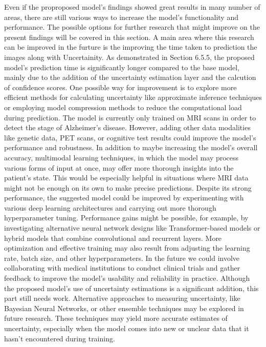 \documentclass[12pt,onecolumn]{report}
\begin{document}
Even if the proproposed model's findings showed great results in many number of areas, there are still various ways to increase the model's functionality and performance. The possible options for further research that might improve on the present findings will be covered in this section.
A main area where this research can be improved in the furture is the improving the time taken to prediction the images along with Uncertainity. As demonstrated in Section 6.5.5, the proposed model's prediction time is significantly longer compared to the base model, mainly due to the addition of the uncertainty estimation layer and the calcution of confidence scores. One possible way for improvement is to explore more efficient methods for calculating uncertainty like approximate inference techniques or employing model compression methods to reduce the computational load during prediction.
The model is currently only trained on MRI scans in order to detect the stage of Alzheimer's disease. However, adding other data modalities like genetic data, PET scans, or cognitive test results could improve the model's performance and robustness. In addition to maybe increasing the model's overall accuracy, multimodal learning techniques, in which the model may process various forms of input at once, may offer more thorough insights into the patient's state. This would be especially helpful in situations where MRI data might not be enough on its own to make precise predictions.
Despite its strong performance, the suggested model could be improved by experimenting with various deep learning architectures and carrying out more thorough hyperparameter tuning. Performance gains might be possible, for example, by investigating alternative neural network designs like Transformer-based models or hybrid models that combine convolutional and recurrent layers. More optimization and effective training may also result from adjusting the learning rate, batch size, and other hyperparameters.
In the future we could involve collaborating with medical institutions to conduct clinical trials and gather feedback to improve the model’s usability and reliability in practice.
Although the proposed model's use of uncertainty estimations is a significant addition, this part still needs work. Alternative approaches to measuring uncertainty, like Bayesian Neural Networks, or other ensemble techniques may be explored in future research. These techniques may yield more accurate estimates of uncertainty, especially when the model comes into new or unclear data that it hasn't encountered during training.
\end{document}

